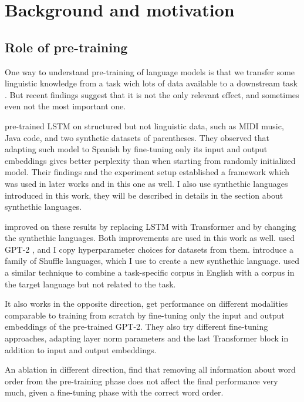 \documentclass[a4paper, 11pt, oneside]{article}
\begin{document}
	\section{Background and motivation}

	\subsection{Role of pre-training}
	One way to understand pre-training of language models is that we transfer some
	linguistic knowledge from a task wich lots of data available to a downstream task
	\cite{han2021pre}. But recent findings suggest that it is not the only
	relevant effect, and sometimes even not the most important one.

	\citet{papadimitriou2020learning} pre-trained LSTM \cite{hochreiter1997long}
	on structured but not linguistic data, such as MIDI music, Java code, and two synthetic
	datasets of parentheses. They observed that adapting such model to Spanish by
	fine-tuning only its input and output embeddings gives better perplexity than
	when starting from randomly initialized model. Their findings and the experiment
	setup established a framework which was used in later works and in this one as
	well. I also use synthethic languages introduced in this work, they will be described
	in details in the section about synthethic languages.

	\citet{ri2022pretraining} improved on these results by replacing LSTM with
	Transformer and by changing the synthethic languages. Both improvements are used
	in this work as well. \citet{papadimitriou2023injecting} used GPT-2 \cite{radford2019language},
	and I copy hyperparameter choices for datasets from them. \citet{chiang2022transferability}
	introduce a family of Shuffle languages, which I use to create a new synthethic
	language. \citet{artetxe2019cross} used a similar technique to combine a task-specific
	corpus in English with a corpus in the target language but not related to the task.

	It also works in the opposite direction, \citet{lu2021pretrained} get performance
	on different modalities comparable to training from scratch by fine-tuning only
	the input and output embeddings of the pre-trained GPT-2. They also try different
	fine-tuning approaches, adapting layer norm parameters and the last
	Transformer block in addition to input and output embeddings.

	An ablation in different direction, \citet{sinha2021masked} find that removing
	all information about word order from the pre-training phase does not affect
	the final performance very much, given a fine-tuning phase with the correct word
	order.
\end{document}
